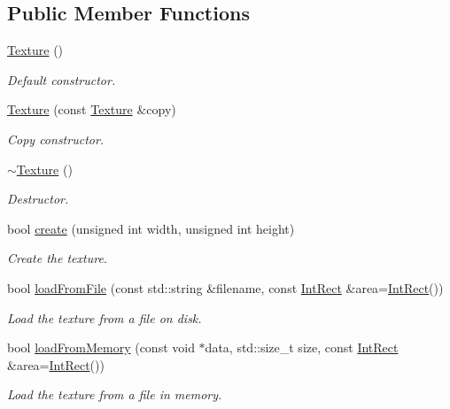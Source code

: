 \subsection*{Public Member Functions}
\begin{DoxyCompactItemize}
\item 
\hyperlink{classsf_1_1_texture_a3e04674853b8533bf981db3173e3a4a7}{Texture} ()
\begin{DoxyCompactList}\small\item\em Default constructor. \end{DoxyCompactList}\item 
\hyperlink{classsf_1_1_texture_a524855cbf89de3b74be84d385fd229de}{Texture} (const \hyperlink{classsf_1_1_texture}{Texture} \&copy)
\begin{DoxyCompactList}\small\item\em Copy constructor. \end{DoxyCompactList}\item 
\mbox{\label{classsf_1_1_texture_a9c5354ad40eb1c5aeeeb21f57ccd7e6c}} 
\hyperlink{classsf_1_1_texture_a9c5354ad40eb1c5aeeeb21f57ccd7e6c}{$\sim$\+Texture} ()
\begin{DoxyCompactList}\small\item\em Destructor. \end{DoxyCompactList}\item 
bool \hyperlink{classsf_1_1_texture_a89b4c7d204acf1033c3a1b6e0a3ad0a3}{create} (unsigned int width, unsigned int height)
\begin{DoxyCompactList}\small\item\em Create the texture. \end{DoxyCompactList}\item 
bool \hyperlink{classsf_1_1_texture_a8e1b56eabfe33e2e0e1cb03712c7fcc7}{load\+From\+File} (const std\+::string \&filename, const \hyperlink{classsf_1_1_rect}{Int\+Rect} \&area=\hyperlink{classsf_1_1_rect}{Int\+Rect}())
\begin{DoxyCompactList}\small\item\em Load the texture from a file on disk. \end{DoxyCompactList}\item 
bool \hyperlink{classsf_1_1_texture_a2c4adb19dd4cbee0a588eeb85e52a249}{load\+From\+Memory} (const void $\ast$data, std\+::size\+\_\+t size, const \hyperlink{classsf_1_1_rect}{Int\+Rect} \&area=\hyperlink{classsf_1_1_rect}{Int\+Rect}())
\begin{DoxyCompactList}\small\item\em Load the texture from a file in memory. \end{DoxyCompactList}\item 

\end{DoxyCompactItemize}
